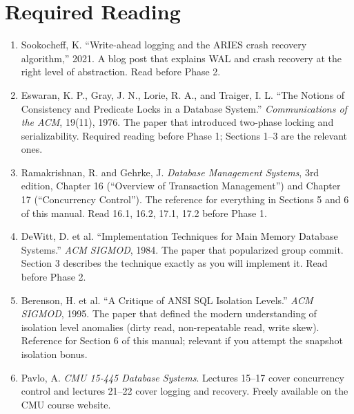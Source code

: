 \documentclass[11pt,a4paper]{article}
\begin{document}
\section{Required Reading}

\begin{enumerate}
\item Sookocheff, K. ``Write-ahead logging and the ARIES crash recovery algorithm,'' 2021. A blog post that explains WAL and crash recovery at the right level of abstraction. Read before Phase 2.

\item Eswaran, K. P., Gray, J. N., Lorie, R. A., and Traiger, I. L. ``The Notions of Consistency and Predicate Locks in a Database System.'' \textit{Communications of the ACM}, 19(11), 1976. The paper that introduced two-phase locking and serializability. Required reading before Phase 1; Sections 1--3 are the relevant ones.

\item Ramakrishnan, R. and Gehrke, J. \textit{Database Management Systems}, 3rd edition, Chapter 16 (``Overview of Transaction Management'') and Chapter 17 (``Concurrency Control''). The reference for everything in Sections 5 and 6 of this manual. Read 16.1, 16.2, 17.1, 17.2 before Phase 1.

\item DeWitt, D. et al. ``Implementation Techniques for Main Memory Database Systems.'' \textit{ACM SIGMOD}, 1984. The paper that popularized group commit. Section 3 describes the technique exactly as you will implement it. Read before Phase 2.

\item Berenson, H. et al. ``A Critique of ANSI SQL Isolation Levels.'' \textit{ACM SIGMOD}, 1995. The paper that defined the modern understanding of isolation level anomalies (dirty read, non-repeatable read, write skew). Reference for Section 6 of this manual; relevant if you attempt the snapshot isolation bonus.

\item Pavlo, A. \textit{CMU 15-445 Database Systems}. Lectures 15--17 cover concurrency control and lectures 21--22 cover logging and recovery. Freely available on the CMU course website.
\end{enumerate}

\footerboxes
\end{document}
